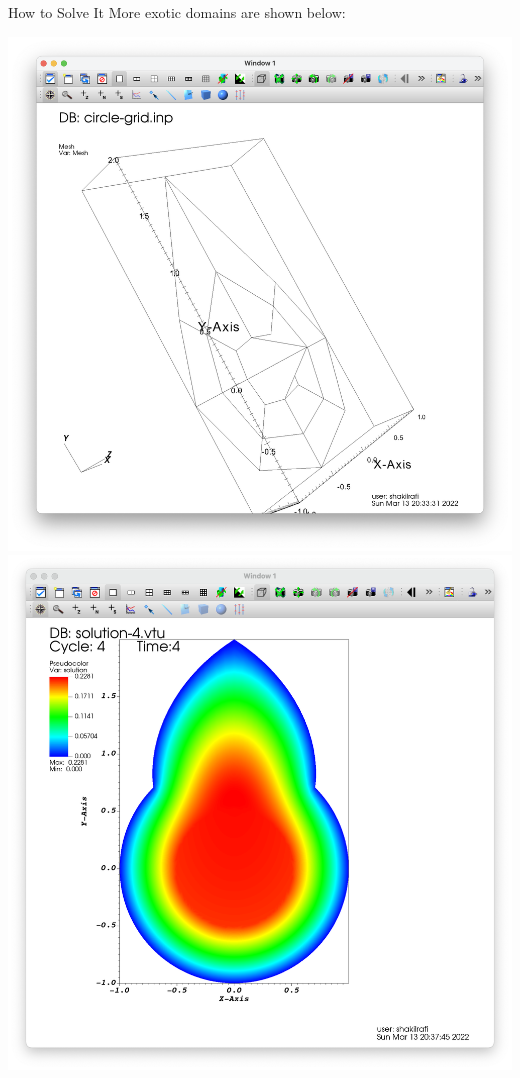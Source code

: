 \documentclass{beamer}
\begin{document}
\begin{frame}{How to Solve It}
    More exotic domains are shown below:

    \includegraphics[scale = 0.16]{MFDomain.png}
    \includegraphics[scale = 0.16]{MFDomainLE.png}
\end{frame}
\end{document}
